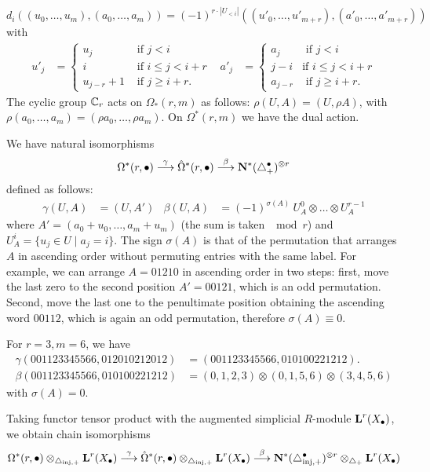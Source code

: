 \[d_i((u_0,\ldots,u_m), (a_0,\ldots,a_m)) = (-1)^{r\cdot |U_{< i}|}((u'_0,\ldots,u'_{m+r}),(a'_0,\ldots,a'_{m+r}))\] with
\begin{align}\label{eq:Omegahat}
	u'_j &=
	\begin{cases}
		u_j &\text{ if $j<i$} \\
		i & \text{ if $i\leq j < i+r$} \\
		u_{j-r} + 1 & \text{ if $j\geq i+r$.}
	\end{cases}
	&
	a'_j &=
	\begin{cases}
		a_j &\text{ if $j<i$} \\
		j-i & \text{if $i\leq j<i+r$} \\
		a_{j-r} & \text{ if $j\geq i+r$.}
	\end{cases}
\end{align}
The cyclic group $\Cyc_r$ acts on $\Omega_*(r,m)$ as follows: $\rho(U,A) = (U,\rho A)$, with $\rho(a_0,\ldots,a_m) = (\rho a_0,\ldots,\rho a_m)$. On $\Omega^*(r,m)$ we have the dual action.

We have natural isomorphisms
\[\Omega^*(r,\bullet)\overset{\gamma}{\lra} \hat{\Omega}^*(r,\bullet)\overset{\beta}{\lra} \NN^*(\asimplex^\bullet)^{\otimes r}\]
defined as follows:
\begin{align*}
	\gamma(U,A) &= (U,A')
	&
	\beta(U,A) &= (-1)^{\sigma(A)}\ U_A^0\otimes \ldots\otimes U_A^{r-1}
\end{align*}
where $A' = (a_0+u_0,\ldots,a_m+u_m)$ (the sum is taken $\mod r$) and $U_A^i = \{u_j\in U\mid a_j=i\}$. The sign $\sigma(A)$ is that of the permutation that arranges $A$ in ascending order without permuting entries with the same label. For example, we can arrange $A=01210$ in ascending order in two steps: first, move the last zero to the second position $A' = 00121$, which is an odd permutation. Second, move the last one to the penultimate position obtaining the ascending word $00112$, which is again an odd permutation, therefore $\sigma(A) \equiv 0$.

\begin{example}\label{ex:103} For $r=3,m=6$, we have
	\begin{align*}                  \gamma(001123345566,012010212012) &= (001123345566,010100221212).
		\\
		\beta(001123345566,010100221212) &= (0,1,2,3)\otimes (0,1,5,6)\otimes (3,4,5,6)
	\end{align*}
	with $\sigma(A) = 0$.
\end{example}
Taking functor tensor product with the augmented simplicial $R$-module $\AA^r(X_\bullet)$, we obtain chain isomorphisms
\[\Omega^*(r,\bullet)\otimes_{\asimplexinj} \AA^r(X_\bullet)\overset{\gamma}{\lra} \hat{\Omega}^*(r,\bullet)\otimes_{\asimplexinj} \AA^r(X_\bullet)\overset{\beta}{\lra} \NN^*(\asimplexinj^\bullet)^{\otimes r}\otimes_{\asimplex} \AA^r(X_\bullet)\]

